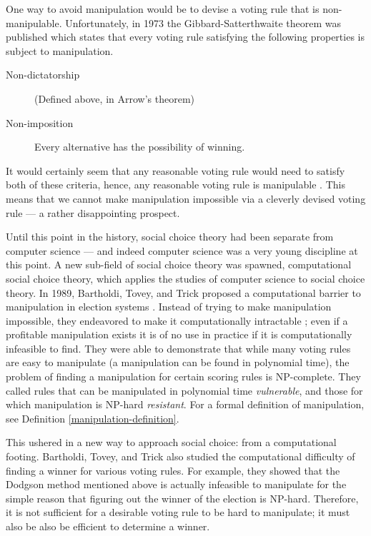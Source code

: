 	One way to avoid manipulation would be to devise a voting rule that is non-manipulable. Unfortunately, in 1973 the Gibbard-Satterthwaite theorem was published which states that every voting rule satisfying the following properties is subject to manipulation.
	\begin{description}
		\item[Non-dictatorship] (Defined above, in Arrow's theorem)
		\item[Non-imposition] Every alternative has the possibility of winning.
	\end{description}
	It would certainly seem that any reasonable voting rule would need to satisfy both of these criteria, hence, any reasonable voting rule is manipulable \cite{gibbard1973manipulation, satterthwaite1975strategy, duggan2000strategic}. This means that we cannot make manipulation impossible via a cleverly devised voting rule --- a rather disappointing prospect.

	Until this point in the history, social choice theory had been separate from computer science --- and indeed computer science was a very young discipline at this point. A new sub-field of social choice theory was spawned, computational social choice theory, which applies the studies of computer science to social choice theory. In 1989, Bartholdi, Tovey, and Trick proposed a computational barrier to manipulation in election systems \cite{bartholdi1989computational}. Instead of trying to make manipulation impossible, they endeavored to make it computationally intractable \cite{chevaleyre2007short}; even if a profitable manipulation exists it is of no use in practice if it is computationally infeasible to find. They were able to demonstrate that while many voting rules are easy to manipulate (a manipulation can be found in polynomial time), the problem of finding a manipulation for certain scoring rules is NP-complete. They called rules that can be manipulated in polynomial time \emph{vulnerable}, and those for which manipulation is NP-hard \emph{resistant}. For a formal definition of manipulation, see Definition \ref{manipulation-definition}.

	This ushered in a new way to approach social choice: from a computational footing. Bartholdi, Tovey, and Trick also studied the computational difficulty of finding a winner for various voting rules. For example, they showed that the Dodgson method mentioned above \cite{dodgson1876method} is actually infeasible to manipulate for the simple reason that figuring out the winner of the election is NP-hard. Therefore, it is not sufficient for a desirable voting rule to be hard to manipulate; it must also be also be efficient to determine a winner.

